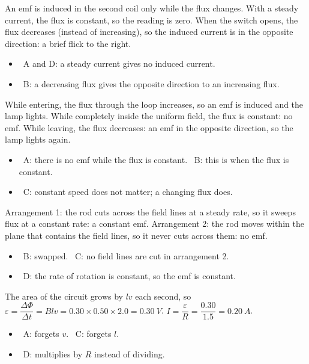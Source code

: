 \documentclass[12pt]{article}
\begin{document}
\begin{practiceanswers}
\begin{practiceans}
  An emf is induced in the second coil only while the flux changes. With a steady current, the flux is
  constant, so the reading is zero. When the switch opens, the flux decreases (instead of increasing), so
  the induced current is in the opposite direction: a brief flick to the right.
  \begin{itemize}
    \item \xmark\ A and D: a steady current gives no induced current.
    \item \xmark\ B: a decreasing flux gives the opposite direction to an increasing flux.
  \end{itemize}
\end{practiceans}

\begin{practiceans}
  While entering, the flux through the loop increases, so an emf is induced and the lamp lights. While
  completely inside the uniform field, the flux is constant: no emf. While leaving, the flux decreases:
  an emf in the opposite direction, so the lamp lights again.
  \begin{itemize}
    \item \xmark\ A: there is no emf while the flux is constant. \quad \xmark\ B: this is when the flux is
          constant.
    \item \xmark\ C: constant speed does not matter; a changing flux does.
  \end{itemize}
\end{practiceans}

\begin{practiceans}
  Arrangement 1: the rod cuts across the field lines at a steady rate, so it sweeps flux at a constant
  rate: a constant emf. Arrangement 2: the rod moves within the plane that contains the field lines, so it
  never cuts across them: no emf.
  \begin{itemize}
    \item \xmark\ B: swapped. \quad \xmark\ C: no field lines are cut in arrangement 2.
    \item \xmark\ D: the rate of rotation is constant, so the emf is constant.
  \end{itemize}
\end{practiceans}

\begin{practiceans}
  The area of the circuit grows by $lv$ each second, so $\varepsilon = \dfrac{\Delta\Phi}{\Delta t} = Blv
  = 0.30 \times 0.50 \times 2.0 = \qty{0.30}{V}$. $I = \dfrac{\varepsilon}{R} = \dfrac{0.30}{1.5} = \qty{0.20}{A}$.
  \begin{itemize}
    \item \xmark\ A: forgets $v$. \quad \xmark\ C: forgets $l$.
    \item \xmark\ D: multiplies by $R$ instead of dividing.
  \end{itemize}
\end{practiceans}


\end{practiceanswers}
\end{document}
